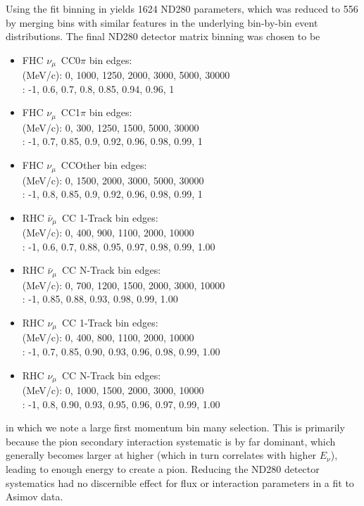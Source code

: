 Using the fit binning in \pmu \cosmu yields 1624 ND280 parameters, which was reduced to 556 by merging bins with similar features in the underlying bin-by-bin event distributions. The final ND280 detector matrix binning was chosen to be
\begin{itemize}
	\item FHC $\nu_{\mu}$~CC0$\pi$ bin edges: \\
	\pmu (MeV/c): 0, 1000, 1250, 2000, 3000, 5000, 30000 \\
	\cosmu:  -1, 0.6, 0.7, 0.8, 0.85, 0.94, 0.96, 1
	\item FHC $\nu_{\mu}$~CC1$\pi$  bin edges: \\
	\pmu (MeV/c):  0, 300, 1250, 1500, 5000, 30000 \\
	\cosmu: -1, 0.7, 0.85, 0.9, 0.92, 0.96, 0.98, 0.99, 1
	\item FHC $\nu_{\mu}$~CCOther bin edges: \\
	\pmu (MeV/c): 0, 1500, 2000, 3000, 5000, 30000 \\
	\cosmu:  -1, 0.8, 0.85, 0.9, 0.92, 0.96, 0.98, 0.99, 1
	\item RHC $\bar{\nu}_{\mu}$~CC 1-Track bin edges: \\
	\pmu (MeV/c): 0, 400, 900, 1100, 2000, 10000 \\
	\cosmu:  -1, 0.6, 0.7, 0.88, 0.95, 0.97, 0.98, 0.99, 1.00
	\item RHC $\bar{\nu}_{\mu}$~CC N-Track bin edges: \\
	\pmu (MeV/c):  0, 700, 1200, 1500, 2000, 3000, 10000 \\
	\cosmu: -1, 0.85, 0.88, 0.93, 0.98, 0.99, 1.00
	\item RHC $\nu_{\mu}$~CC 1-Track bin edges: \\
	\pmu (MeV/c):  0, 400, 800, 1100, 2000, 10000 \\
	\cosmu:   -1, 0.7, 0.85, 0.90, 0.93, 0.96, 0.98, 0.99, 1.00
	\item RHC $\nu_{\mu}$~CC N-Track bin edges: \\
	\pmu (MeV/c):  0, 1000, 1500, 2000, 3000, 10000 \\
	\cosmu: -1, 0.8, 0.90, 0.93, 0.95, 0.96, 0.97, 0.99, 1.00
\end{itemize}
in which we note a large first momentum bin many selection. This is primarily because the pion secondary interaction systematic is by far dominant, which generally becomes larger at higher \pmu (which in turn correlates with higher $E_\nu$), leading to enough energy to create a pion. Reducing the ND280 detector systematics had no discernible effect for flux or interaction parameters in a fit to Asimov data.

